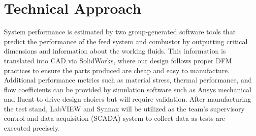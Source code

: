 \section*{Technical Approach}

System performance is estimated by two group-generated software tools that predict the performance of the feed system and combustor by outputting critical dimensions and information about the working fluids. This information is translated into CAD via SolidWorks, where our design follows proper DFM practices to ensure the parts produced are cheap and easy to manufacture. Additional performance metrics such as material stress, thermal performance, and flow coefficients can be provided by simulation software such as Ansys mechanical and fluent to drive design choices but will require validation. After manufacturing the test stand, LabVIEW and Synnax will be utilized as the team’s supervisory control and data acquisition (SCADA) system to collect data as tests are executed precisely.